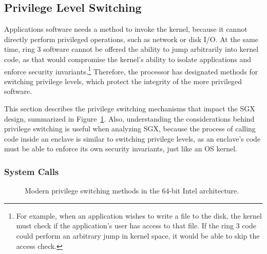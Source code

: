 \subsection{Privilege Level Switching}
\label{sec:privilege_switches}

Applications software needs a method to invoke the kernel, because it cannot
directly perform privileged operations, such as network or disk I/O. At the
same time, ring 3 software cannot be offered the ability to jump arbitrarily
into kernel code, as that would compromise the kernel's ability to isolate
applications and enforce security invariants.\footnote{For example, when an
application wishes to write a file to the disk, the kernel must check if the
application's user has access to that file. If the ring 3 code could perform
an arbitrary jump in kernel space, it would be able to skip the access check.}
Therefore, the processor has designated methods for switching privilege levels,
which protect the integrity of the more privileged software.

This section describes the privilege switching mechanisms that impact the SGX
design, summarized in Figure~\ref{fig:cpu_ring_switch}. Also, understanding the
considerations behind privilege switching is useful when analyzing SGX, because
the process of calling code inside an enclave is similar to switching privilege
levels, as an enclave's code must be able to enforce its own security
invariants, just like an OS kernel.


\subsubsection{System Calls}
\label{sec:syscalls}


\begin{figure}[hbt]
  \caption{
    Modern privilege switching methods in the 64-bit Intel architecture.
  }
  \label{fig:cpu_ring_switch}
\end{figure}

